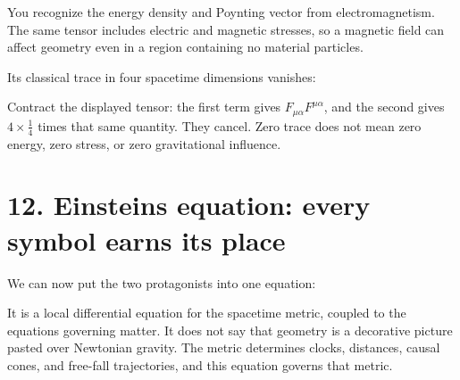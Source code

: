 \documentclass[
  11pt,
  letterpaper,
  oneside,
  openany]{scrbook}
\begin{document}
\begin{center}
\begingroup
{}
\ifdim\wd\grmathbox>\linewidth
\resizebox{\linewidth}{!}{\usebox{\grmathbox}}
\else\usebox{\grmathbox}\fi
\endgroup
\end{center}

You recognize the energy density and Poynting vector from
electromagnetism. The same tensor includes electric and magnetic
stresses, so a magnetic field can affect geometry even in a region
containing no material particles.

Its classical trace in four spacetime dimensions vanishes:

\begin{center}
\begingroup
{}
\ifdim\wd\grmathbox>\linewidth
\resizebox{\linewidth}{!}{\usebox{\grmathbox}}
\else\usebox{\grmathbox}\fi
\endgroup
\end{center}

Contract the displayed tensor: the first term gives
\(F_{\mu\alpha}F^{\mu\alpha}\), and the second gives \(4\times\frac14\)
times that same quantity. They cancel. Zero trace does not mean zero
energy, zero stress, or zero gravitational influence.

\hypertarget{chapter-12}{%
\chapter{12. Einstein\textquotesingle s equation: every symbol earns its
place}\label{chapter-12}}

We can now put the two protagonists into one equation:

\begin{center}
\begingroup
{}
\ifdim\wd\grmathbox>\linewidth
\resizebox{\linewidth}{!}{\usebox{\grmathbox}}
\else\usebox{\grmathbox}\fi
\endgroup
\end{center}

It is a local differential equation for the spacetime metric, coupled to
the equations governing matter. It does not say that geometry is a
decorative picture pasted over Newtonian gravity. The metric determines
clocks, distances, causal cones, and free-fall trajectories, and this
equation governs that metric.
\end{document}
